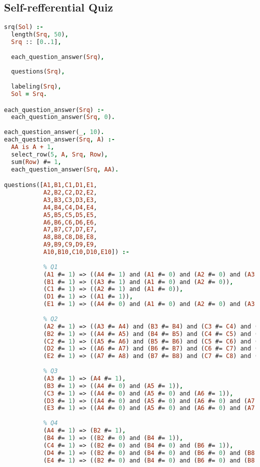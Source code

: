 \subsection{Self-refferential Quiz}
\begin{lstlisting}[language=PROLOG]
srq(Sol) :-
  length(Srq, 50),
  Srq :: [0..1],
  
  each_question_answer(Srq),
  
  questions(Srq),
  
  labeling(Srq),
  Sol = Srq.

each_question_answer(Srq) :-
  each_question_answer(Srq, 0).
  
each_question_answer(_, 10).
each_question_answer(Srq, A) :-
  AA is A + 1,
  select_row(5, A, Srq, Row),
  sum(Row) #= 1,
  each_question_answer(Srq, AA).

questions([A1,B1,C1,D1,E1,
           A2,B2,C2,D2,E2,
           A3,B3,C3,D3,E3,
           A4,B4,C4,D4,E4,
           A5,B5,C5,D5,E5,
           A6,B6,C6,D6,E6,
           A7,B7,C7,D7,E7,
           A8,B8,C8,D8,E8,
           A9,B9,C9,D9,E9,
           A10,B10,C10,D10,E10]) :-
           
           % Q1
           (A1 #= 1) => ((A4 #= 1) and (A1 #= 0) and (A2 #= 0) and (A3 #= 0)),
           (B1 #= 1) => ((A3 #= 1) and (A1 #= 0) and (A2 #= 0)),
           (C1 #= 1) => ((A2 #= 1) and (A1 #= 0)),
           (D1 #= 1) => ((A1 #= 1)),
           (E1 #= 1) => ((A4 #= 0) and (A1 #= 0) and (A2 #= 0) and (A3 #= 0)),
           
           % Q2
           (A2 #= 1) => ((A3 #= A4) and (B3 #= B4) and (C3 #= C4) and (D3 #= D4) and (E3 #= E4)),
           (B2 #= 1) => ((A4 #= A5) and (B4 #= B5) and (C4 #= C5) and (D4 #= D5) and (E4 #= E5)),
           (C2 #= 1) => ((A5 #= A6) and (B5 #= B6) and (C5 #= C6) and (D5 #= D6) and (E5 #= E6)),
           (D2 #= 1) => ((A6 #= A7) and (B6 #= B7) and (C6 #= C7) and (D6 #= D7) and (E6 #= E7)),
           (E2 #= 1) => ((A7 #= A8) and (B7 #= B8) and (C7 #= C8) and (D7 #= D8) and (E7 #= E8)),
           
           % Q3
           (A3 #= 1) => (A4 #= 1),
           (B3 #= 1) => ((A4 #= 0) and (A5 #= 1)),
           (C3 #= 1) => ((A4 #= 0) and (A5 #= 0) and (A6 #= 1)),
           (D3 #= 1) => ((A4 #= 0) and (A5 #= 0) and (A6 #= 0) and (A7 #= 1)),
           (E3 #= 1) => ((A4 #= 0) and (A5 #= 0) and (A6 #= 0) and (A7 #= 0) and (A8 #= 1)),
           
           % Q4
           (A4 #= 1) => (B2 #= 1),
           (B4 #= 1) => ((B2 #= 0) and (B4 #= 1)),
           (C4 #= 1) => ((B2 #= 0) and (B4 #= 0) and (B6 #= 1)),
           (D4 #= 1) => ((B2 #= 0) and (B4 #= 0) and (B6 #= 0) and (B8 #= 1)),
           (E4 #= 1) => ((B2 #= 0) and (B4 #= 0) and (B6 #= 0) and (B8 #= 0) and (B10 #= 1)),
           

\end{lstlisting}
